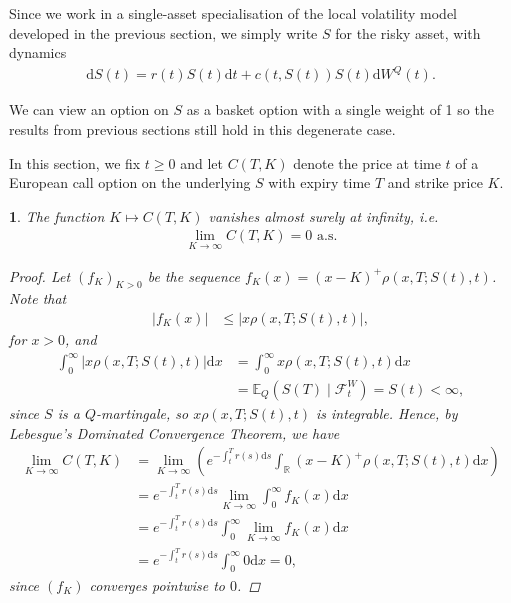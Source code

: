 \documentclass[english]{article}
\numberwithin{equation}{section}
\numberwithin{figure}{section}
\theoremstyle{bolddescit}
\newtheorem{theorem}{\protect\theoremname}[section]
\theoremstyle{definition}
\theoremstyle{definition}
\theoremstyle{plain}
\theoremstyle{plain}
\theoremstyle{bolddesc}
\theoremstyle{plain}
\theoremstyle{remark}
\providecommand{\theoremname}{Theorem}
\begin{document}
Since we work in a single-asset specialisation of the local volatility model developed in the previous section, we simply write $S$ for the risky asset, with dynamics
\begin{align*}
  \mathrm{d}S(t) = r(t) S(t) \mathrm{d}t + c(t,S(t)) S(t) \mathrm{d}W^Q(t).
\end{align*}

We can view an option on $S$ as a basket option with a single weight of 1 so the results from previous sections still hold in this degenerate case.

In this section, we fix $t \ge 0$ and let $C(T,K)$ denote the price at time $t$ of a European call option on the underlying $S$ with expiry time $T$ and strike price $K$.

\begin{theorem}\label{thm:dupire-asymptotic}
  The function $K \mapsto C(T,K)$ vanishes almost surely at infinity, i.e.
  \begin{align*}
    \lim_{K \to \infty} C(T,K) = 0 \text{ a.s.}
  \end{align*}

  \begin{proof}
    Let $(f_K)_{K > 0}$ be the sequence $f_K(x) = (x-K)^+ \rho(x,T;S(t),t)$. Note that
    \begin{align*}
      |f_K(x)|
      &\le |x \rho(x,T;S(t),t)|,
    \end{align*}
    for $x > 0$, and
    \begin{align*}
      \int_0^\infty |x\rho(x,T;S(t),t)| \mathrm{d}x
      &= \int_0^\infty x\rho(x,T;S(t),t) \mathrm{d}x \tag{positive integrand}\\
      &= \mathbb{E}_Q(S(T) \mid \mathcal{F}^W_t)
      = S(t) < \infty,
    \end{align*}
    since $S$ is a $Q$-martingale, so $x \rho(x,T;S(t),t)$ is integrable. Hence, by Lebesgue's Dominated Convergence Theorem, we have
    \begin{align*}
      \lim_{K \to \infty} C(T,K)
      &= \lim_{K \to \infty} \left(e^{-\int_t^T r(s) \mathrm{d}s} \int_\mathbb{R} (x-K)^+ \rho(x,T;S(t),t) \mathrm{d}x\right) \\
      &= e^{-\int_t^T r(s) \mathrm{d}s} \lim_{K \to \infty} \int_0^\infty f_K(x) \mathrm{d}x\\
      &= e^{-\int_t^T r(s) \mathrm{d}s} \int_0^\infty \lim_{K \to \infty} f_K(x) \mathrm{d}x\\
      &= e^{-\int_t^T r(s) \mathrm{d}s} \int_0^\infty 0 \mathrm{d}x = 0,
    \end{align*}
    since $(f_K)$ converges pointwise to $0$.
  \end{proof}
\end{theorem}
\end{document}
